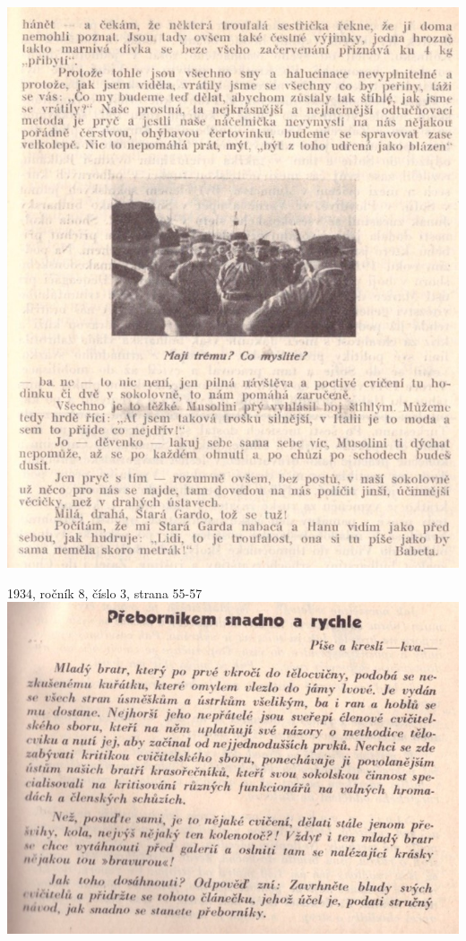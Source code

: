 \documentclass[11pt]{article}
\begin{document}
\includegraphics[width=\imagewidth]{original/1932/Skener_20250320 (12).jpg}




\clearpage

1934, ročník 8, číslo 3, strana 55-57 \\
\includegraphics[width=\imagewidth]{original/1934/Skener_20250325 (8).jpg}
\end{document}
